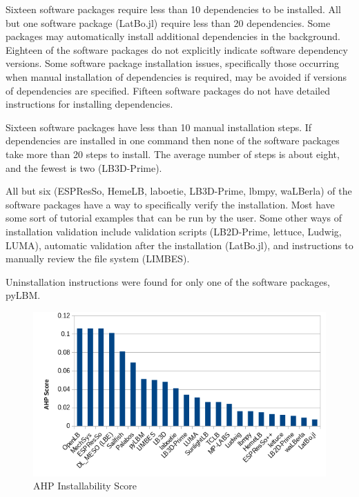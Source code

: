 \documentclass[12pt, notitlepage]{article}
\begin{document}
Sixteen software packages require less than 10 dependencies to be installed. All but one software package (LatBo.jl) require less than 20 dependencies. Some packages may automatically install additional dependencies in the background. Eighteen of the software packages do not explicitly indicate software dependency versions. Some software package installation issues, specifically those occurring when manual installation of dependencies is required, may be avoided if versions of dependencies are specified. Fifteen software packages do not have detailed instructions for installing dependencies. 

Sixteen software packages have less than 10 manual installation steps. If dependencies are installed in one command then none of the software packages take more than 20 steps to install. The average number of steps is about eight, and the fewest is two (LB3D-Prime). 

All but six (ESPResSo, HemeLB, laboetie, LB3D-Prime, lbmpy, waLBerla) of the software packages have a way to specifically verify the installation. Most have some sort of tutorial examples that can be run by the user. Some other ways of installation validation include validation scripts (LB2D-Prime, lettuce, Ludwig, LUMA), automatic validation after the installation (LatBo.jl), and instructions to manually review the file system (LIMBES). 

Uninstallation instructions were found for only one of the software packages, pyLBM.

\begin{figure}[h!]
	\begin{center}
		\includegraphics[width=1.0\textwidth]{installability_chart}
		\caption{AHP Installability Score}
		\label{Fig_Installability}
	\end{center}
\end{figure}
\end{document}
